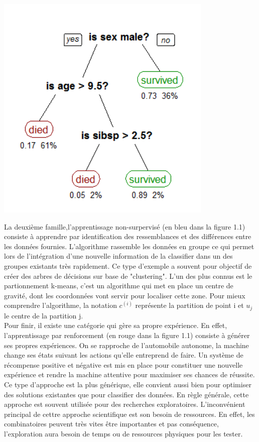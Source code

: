 \documentclass[12pt,a4paper]{report}
\begin{document}
\begin{center}
	\includegraphics[scale=0.5]{ML_superviser}
	\label{fig1}
\end{center}


La deuxième famille,l'apprentissage non-surpervisé (en bleu dans la figure 1.1) consiste à apprendre par identification des ressemblances et des différences entre les données fournies. L'algorithme rassemble les données en groupe ce qui permet lors de l'intégration d'une nouvelle information de la classifier dans un des groupes existants très rapidement. Ce type d'exemple a souvent pour objectif de créer des arbres de décisions sur base de "clustering".
L'un des plus connus est le partionnement k-means, c'est un algorithme qui met en place un centre de gravité, dont les coordonnées vont servir pour localiser cette zone. Pour mieux comprendre l'algorithme, la notation $c^{(i)}$ représente la partition de point i et $u_j$ le centre de la partition j.\\

Pour finir, il existe une catégorie qui gère sa propre expérience. En effet, l'apprentissage par renforcement (en rouge dans la figure 1.1) consiste à générer ses propres expériences. On se rapproche de l'automobile autonome, la machine change ses états suivant les actions qu'elle entreprend de faire. Un système de récompense positive et négative est mis en place pour constituer une nouvelle expérience et rendre la machine attentive pour maximiser ses chances de réussite. Ce type d'approche est la plus générique, elle convient aussi bien pour optimiser des solutions existantes que pour classifier des données. En règle générale, cette approche est souvent utilisée pour des recherches exploratoires. L'inconvénient principal de cettre approche scientifique est son besoin de ressources. En effet, les combinatoires peuvent très vites être importantes et pas conséquence, l'exploration aura besoin de temps ou de ressources physiques pour les tester.\\
\end{document}
